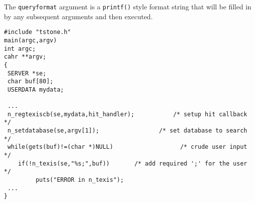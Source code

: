The \verb`queryformat` argument is a \verb`printf()` style format string
that will be filled in by any subsequent arguments and then executed.

\EXAMPLE
\begin{verbatim}
#include "tstone.h"
main(argc,argv)
int argc;
cahr **argv;
{
 SERVER *se;
 char buf[80];
 USERDATA mydata;

 ...
 n_regtexiscb(se,mydata,hit_handler);           /* setup hit callback */
 n_setdatabase(se,argv[1]);                 /* set database to search */
 while(gets(buf)!=(char *)NULL)                   /* crude user input */
    if(!n_texis(se,"%s;",buf))       /* add required ';' for the user */
         puts("ERROR in n_texis");
 ...
}
\end{verbatim}
